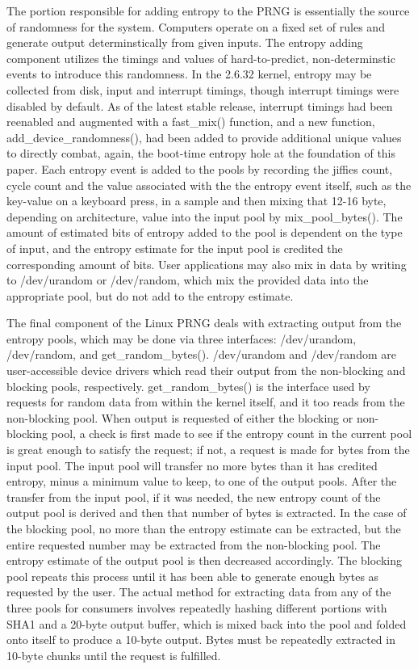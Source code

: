 The portion responsible for adding entropy to the PRNG is essentially the source of randomness for the system.  Computers operate on a fixed set of rules and generate output determinstically from given inputs. The entropy adding component utilizes the timings and values of hard-to-predict, non-determinstic events to introduce this randomness.  In the 2.6.32 kernel, entropy may be collected from disk, input and interrupt timings, though interrupt timings were disabled by default.  As of the latest stable release, interrupt timings had been reenabled and augmented with a fast\_mix() function, and a new function, add\_device\_randomness(), had been added to provide additional unique values to directly combat, again, the boot-time entropy hole at the foundation of this paper. Each entropy event is added to the pools by recording the jiffies count, cycle count and the value associated with the the entropy event itself, such as the key-value on a keyboard press, in a sample and then mixing that 12-16 byte, depending on architecture, value into the input pool by mix\_pool\_bytes().  The amount of estimated bits of entropy added to the pool is dependent on the type of input, and the entropy estimate for the input pool is credited the corresponding amount of bits.  User applications may also mix in data by writing to /dev/urandom or /dev/random, which mix the provided data into the appropriate pool, but do not add to the entropy estimate.

The final component of the Linux PRNG deals with extracting output from the entropy pools, which may be done via three interfaces:  /dev/urandom, /dev/random, and get\_random\_bytes().  /dev/urandom and /dev/random are user-accessible device drivers which read their output from the non-blocking and blocking pools, respectively.  get\_random\_bytes() is the interface used by requests for random data from within the kernel itself, and it too reads from the non-blocking pool. When output is requested of either the blocking or non-blocking pool, a check is first made to see if the entropy count in the current pool is great enough to satisfy the request; if not, a request is made for bytes from the input pool.  The input pool will transfer no more bytes than it has credited entropy, minus a minimum value to keep, to one of the output pools. After the transfer from the input pool, if it was needed, the new entropy count of the output pool is derived and then that number of bytes is extracted.  In the case of the blocking pool, no more than the entropy estimate can be extracted, but the entire requested number may be extracted from the non-blocking pool.  The entropy estimate of the output pool is then decreased accordingly.  The blocking pool repeats this process until it has been able to generate enough bytes as requested by the user. The actual method for extracting data from any of the three pools for consumers involves repeatedly hashing different portions with SHA1 and a 20-byte output buffer, which is mixed back into the pool and folded onto itself to produce a 10-byte output. Bytes must be repeatedly extracted in 10-byte chunks until the request is fulfilled.

